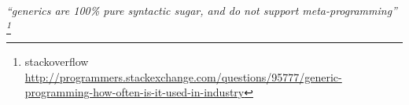 \documentclass[a4paper,USenglish]{lipics}
\author{Anonymized for the submission}
\begin{document}
\maketitle
\hfill
  \parbox{40ex}{%
    \begin{flushright}
    \scriptsize\itshape ``\protect \Java   generics are 100\protect\% pure syntactic sugar,
    and do not support meta-programming''%
\footnote{%
      stackoverflow
      \tiny
       \url{http://programmers.stackexchange.com/questions/95777/generic-programming-how-often-is-it-used-in-industry}
    }
    \end{flushright}
  }
\newline





% 
% 
% 
% 
% 
% 
% 
% 
\end{document}
